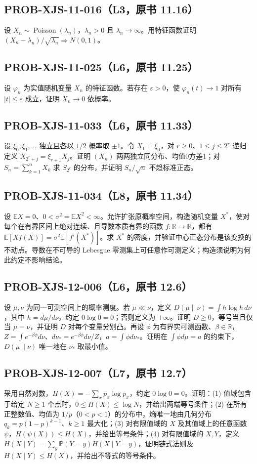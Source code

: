 \documentclass[UTF8]{ctexart}
\begin{document}
\subsection*{PROB-XJS-11-016（L3，原书 11.16）}
设 $X_n\sim\operatorname{Poisson}(\lambda_n)$，$\lambda_n>0$ 且 $\lambda_n\to\infty$。用特征函数证明 $(X_n-\lambda_n)/\sqrt{\lambda_n}\Rightarrow N(0,1)$。

\subsection*{PROB-XJS-11-025（L6，原书 11.25）}
设 $\varphi_n$ 为实值随机变量 $X_n$ 的特征函数。若存在 $\varepsilon>0$，使 $\varphi_n(t)\to1$ 对所有 $|t|\le\varepsilon$ 成立，证明 $X_n\to0$ 依概率。

\subsection*{PROB-XJS-11-033（L6，原书 11.33）}
设 $\xi_0,\xi_1,\ldots$ 独立且各以 $1/2$ 概率取 $\pm1$。令 $X_1=\xi_0$，对 $r\ge0$、$1\le j\le2^r$ 递归定义 $X_{2^r+j}=\xi_{r+1}X_j$。证明 $(X_n)$ 两两独立同分布、均值0方差1；对 $S_n=\sum_{k=1}^nX_k$ 求 $S_{2^r}$ 的分布，并证明 $S_n/\sqrt n$ 不趋标准正态。

\subsection*{PROB-XJS-11-034（L8，原书 11.34）}
设 $\mathbb EX=0$、$0<\sigma^2=\mathbb EX^2<\infty$。允许扩张原概率空间，构造随机变量 $X^*$，使对每个在有界区间上绝对连续、且导数本质有界的函数 $f:\mathbb R\to\mathbb R$，都有 $\mathbb E[Xf(X)]=\sigma^2\mathbb E[f'(X^*)]$。求 $X^*$ 的密度，并验证中心正态分布是该变换的不动点。导数在不可导的 Lebesgue 零测集上可任意作可测定义；构造须说明为何此约定不影响结论。

\subsection*{PROB-XJS-12-006（L6，原书 12.6）}
设 $\mu,\nu$ 为同一可测空间上的概率测度。若 $\mu\ll\nu$，定义 $D(\mu\|\nu)=\int h\log h\,d\nu$，其中 $h=d\mu/d\nu$，约定 $0\log0=0$；否则定义为 $+\infty$。证明 $D\ge0$，等号当且仅当 $\mu=\nu$，并证明 $D$ 对每个变量分别凸。再设 $\phi$ 为有界实可测函数、$\beta\in\mathbb R$，$Z=\int e^{-\beta\phi}d\nu$、$d\nu_*=e^{-\beta\phi}d\nu/Z$，$a=\int\phi d\nu_*$。证明在 $\int\phi d\mu=a$ 的约束下，$D(\mu\|\nu)$ 唯一地在 $\nu_*$ 取最小值。

\subsection*{PROB-XJS-12-007（L7，原书 12.7）}
采用自然对数，$H(X)=-\sum_xp_x\log p_x$，约定 $0\log0=0$。证明：(1) 值域包含于给定 $N\ge1$ 个点时，$0\le H(X)\le\log N$，并给出两端等号条件；(2) 在所有正整数值、均值为 $1/p$（$0<p<1$）的分布中，熵唯一地由几何分布 $q_k=p(1-p)^{k-1}$、$k\ge1$ 最大化；(3) 对有限值域的 $X$ 及其值域上的任意函数 $\psi$，$H(\psi(X))\le H(X)$，并给出等号条件；(4) 对有限值域的 $X,Y$，定义 $H(X\mid Y)=\sum_y\mathbb P(Y=y)H(X\mid Y=y)$，证明链式法则及 $H(X\mid Y)\le H(X)$，并给出不等式的等号条件。
\end{document}
